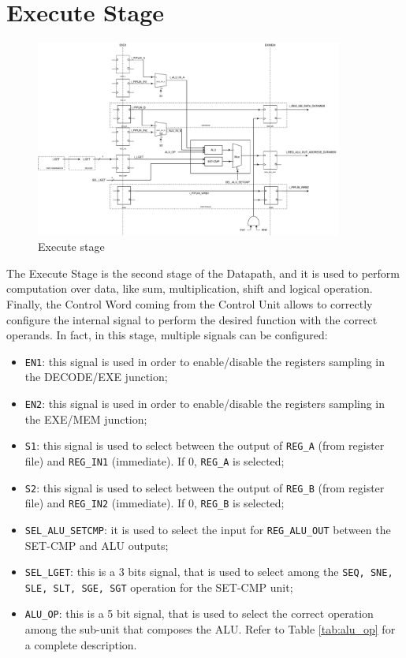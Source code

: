 \chapter{Execute Stage}

\begin{figure}[H]   
    \centering
    \includegraphics[width=0.9\textwidth]{chapters/5_ExecuteStage/images/exe_stage.pdf}
    \caption{Execute stage}
    \label{fig:execute-stage}
\end{figure}

The Execute Stage is the second stage of the Datapath, and it is used to perform computation over data, like sum, multiplication, shift and logical operation. Finally, the Control Word coming from the Control Unit allows to correctly configure the internal signal to perform the desired function with the correct operands. In fact, in this stage, multiple signals can be configured:
\begin{itemize}
    \itemsep0sp
    \item \texttt{EN1}: this signal is used in order to enable/disable the registers sampling in the DECODE/EXE junction;
    \item \texttt{EN2}: this signal is used in order to enable/disable the registers sampling in the EXE/MEM junction;
    \item \texttt{S1}: this signal is used to select between the output of \texttt{REG\_A} (from register file) and \texttt{REG\_IN1} (immediate). If 0, \texttt{REG\_A} is selected;
    \item \texttt{S2}: this signal is used to select between the output of \texttt{REG\_B} (from register file) and \texttt{REG\_IN2} (immediate). If 0, \texttt{REG\_B} is selected;
    \item \texttt{SEL\_ALU\_SETCMP}: it is used to select the input for \texttt{REG\_ALU\_OUT} between the SET-CMP and ALU outputs;
    \item \texttt{SEL\_LGET}: this is a 3 bits signal, that is used to select among the \texttt{SEQ, SNE, SLE, SLT, SGE, SGT} operation for the SET-CMP unit;
    \item \texttt{ALU\_OP}: this is a 5 bit signal, that is used to select the correct operation among the sub-unit that composes the ALU. Refer to Table \ref{tab:alu_op} for a complete description.
    
\end{itemize}

